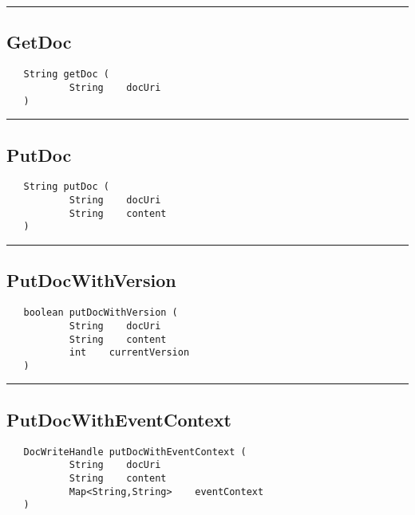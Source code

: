 \rule{15cm}{2pt}
\subsection{GetDoc}
\label{Api:GetDoc}
\begin{verbatim}
   String getDoc (
           String    docUri
   )
\end{verbatim}



\rule{15cm}{2pt}
\subsection{PutDoc}
\label{Api:PutDoc}
\begin{verbatim}
   String putDoc (
           String    docUri
           String    content
   )
\end{verbatim}



\rule{15cm}{2pt}
\subsection{PutDocWithVersion}
\label{Api:PutDocWithVersion}
\begin{verbatim}
   boolean putDocWithVersion (
           String    docUri
           String    content
           int    currentVersion
   )
\end{verbatim}



\rule{15cm}{2pt}
\subsection{PutDocWithEventContext}
\label{Api:PutDocWithEventContext}
\begin{verbatim}
   DocWriteHandle putDocWithEventContext (
           String    docUri
           String    content
           Map<String,String>    eventContext
   )
\end{verbatim}



